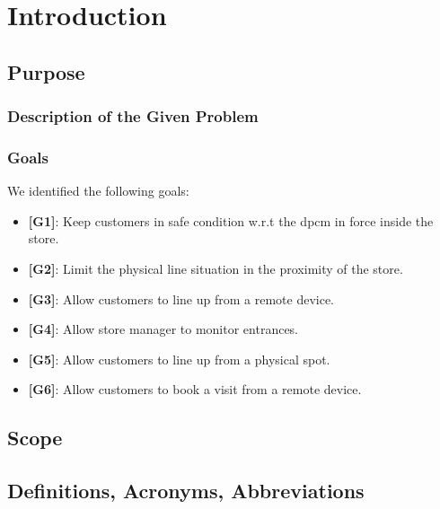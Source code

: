 \chapter{Introduction}

\section{Purpose}

\subsection{Description of the Given Problem}

\subsection{Goals}

We identified the following goals:

\begin{itemize}

	\item {\textbf{[G1]}}: Keep customers in safe condition w.r.t the \gls{dpcm} in force inside the store.
		
	\item {\textbf{[G2]}}: Limit the physical line situation in the proximity
of the store.
		
	\item {\textbf{[G3]}}: Allow customers to line up from a remote device.
	
	\item {\textbf{[G4]}}: Allow store manager to monitor entrances.
	
	\item {\textbf{[G5]}}: Allow customers to line up from a physical spot.
	
	\item {\textbf{[G6]}}: Allow customers to book a visit from a remote
device.

	
\end{itemize}

\section{Scope}

\section{Definitions, Acronyms, Abbreviations}

